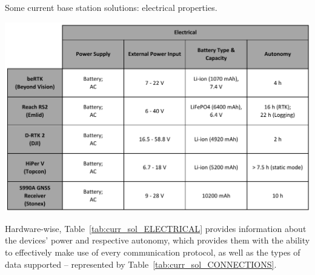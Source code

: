 \begingroup
\begin{table}[h]
    \centering
	\captionsetup{justification=centering}
	\caption{Some current base station solutions: electrical properties.}
	\includegraphics[width=1.0\textwidth]{Chapters/Figures/curr_solutions/ELECTRICAL_v2.pdf}
	\label{tab:curr_sol_ELECTRICAL}
\end{table}
\endgroup

Hardware-wise, Table~\ref{tab:curr_sol_ELECTRICAL} provides information about the devices' power and respective autonomy, which provides them with the ability to effectively make use of every communication protocol, as well as the types of data supported -- represented by Table~\ref{tab:curr_sol_CONNECTIONS}.


